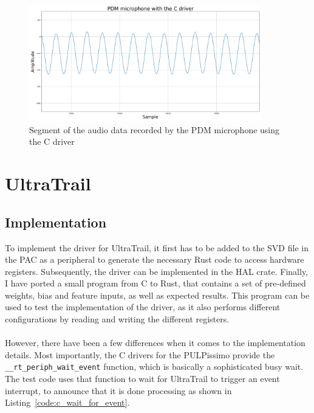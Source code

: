 \begin{figure}[H]
    \centering
    \includegraphics[width=0.9\textwidth]{figures/pdm/pdm_c.png}
    \caption[Segment of the audio data recorded by the PDM microphone using the C driver]{Segment of the audio data recorded by the PDM microphone using the C driver}
    \label{fig:pdm_c}
\end{figure}

\newpage

\section{UltraTrail}

\subsection{Implementation}

To implement the driver for UltraTrail, it first has to be added to the SVD file in the PAC
as a peripheral to generate the necessary Rust code to access hardware registers.
Subsequently, the driver can be implemented in the HAL crate.
Finally, I have ported a small program from C to Rust, that contains a set of pre-defined
weights, bias and feature inputs, as well as expected results.
This program can be used to test the implementation of the driver, as it also
performs different configurations by reading and writing the different registers.
\\\\
However, there have been a few differences when it comes to the implementation details.
Most importantly, the C drivers for the PULPissimo provide the \lstinline{__rt_periph_wait_event} function,
which is basically a sophisticated busy wait.
The test code uses that function to wait for UltraTrail to trigger an event interrupt, to announce that
it is done processing as shown in Listing~\ref{code:c_wait_for_event}.

